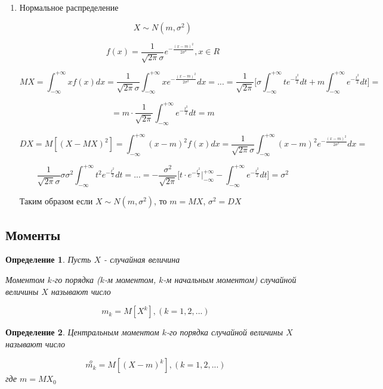 \documentclass[a4paper, 14pt]{report}
\newtheorem{defenition}{Определение}[section]
\begin{document}
\begin{enumerate}
    \item Нормальное распределение

        $$
        X \sim N(m, \sigma^2)
        $$

        $$
        f(x) = \frac{1}{\sqrt{2 \pi} \sigma} e^{-\frac{(x-m)^2}{2\sigma^2}}, x \in R
        $$

        $$
        MX = \int_{-\infty}^{+\infty} xf(x)dx = \frac{1}{\sqrt{2\pi}\sigma} \int_{-\infty}^{+\infty} x e^{-\frac{(x-m)^2}{2\sigma^2}}dx = ... = \frac{1}{\sqrt{2\pi}} \bigg[ \sigma \int_{-\infty}^{+\infty} t e^{-\frac{t^2}{2}}dt + m \int_{-\infty}^{+\infty} e^{-\frac{t^2}{2}}dt \bigg] =
        $$

        $$
        = m \cdot \frac{1}{\sqrt{2\pi}} \int_{-\infty}^{+\infty} e^{-\frac{t^2}{2}} dt = m
        $$

        $$
        DX = M[(X - MX)^2] = \int_{-\infty}^{+\infty} (x-m)^2 f(x) dx = \frac{1}{\sqrt{2\pi} \sigma} \int_{-\infty}^{+\infty} (x-m)^2 e^{-\frac{(x-m)^2}{2\sigma^2}} dx =
        $$

        $$
        \frac{1}{\sqrt{2\pi}\sigma} \sigma \sigma^2 \int_{-\infty}^{+\infty} t^2 e^{-\frac{t^2}{2}} dt = ... = -\frac{\sigma^2}{\sqrt{2\pi}} \bigg[ t \cdot e^{-\frac{t^2}{2}}|_{-\infty}^{+\infty} - \int_{-\infty}^{+\infty} e^{-\frac{t^2}{2}}dt \bigg] = \sigma^2
        $$

        Таким образом если $X \sim N(m, \sigma^2)$, то $m=MX$, $\sigma^2 = DX$
\end{enumerate}

\subsection{Моменты}

\begin{defenition}
    Пусть $X$ - случайная величина

    Моментом $k$-го порядка ($k$-м моментом, $k$-м начальным моментом) случайной величины $X$ называют число

    $$
    m_k = M[X^k], (k=1,2,...)
    $$
\end{defenition}

\begin{defenition}
    Центральным моментом $k$-го порядка случайной величины $X$ называют число

    $$
    \overset{o}{m_k} = M[(X-m)^k], (k=1,2,...)
    $$
    где $m=MX_0$
\end{defenition}
\end{document}
